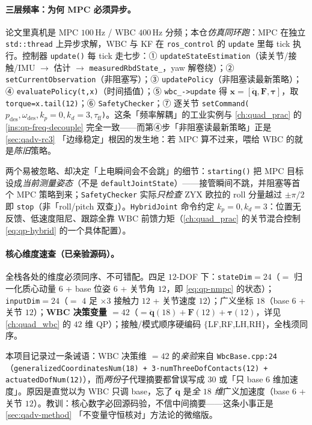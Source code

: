 \paragraph{三层频率：为何 MPC 必须异步。}
论文里真机是 MPC $100$\,Hz / WBC $400$\,Hz 分频；本仓\emph{仿真同环跑}：MPC 在独立 \texttt{std::thread} 上异步求解，WBC 与 KF 在 \texttt{ros\_control} 的 \texttt{update} 里每 tick 执行。控制器 \texttt{update()} 每 tick 走七步\cite{sleiman2021unified}：① \texttt{updateStateEstimation}（读关节/接触/IMU $\to$ 估计 $\to$ \texttt{measuredRbdState\_}，yaw 解卷绕）；② \texttt{setCurrentObservation}（非阻塞写）；③ \texttt{updatePolicy}（非阻塞读最新策略）；④ \texttt{evaluatePolicy(t,x)}（时间插值）；⑤ \texttt{wbc\_->update} 得 $\boldsymbol{x}=[\ddot{\boldsymbol{q}},\boldsymbol{F},\boldsymbol{\tau}]$，取 \texttt{torque=x.tail(12)}；⑥ \texttt{SafetyChecker}；⑦ 逐关节 \texttt{setCommand($p_{\mathrm{des}},\omega_{\mathrm{des}},k_p{=}0,k_d{=}3,\tau_{\mathrm{ff}}$)}。这条「频率解耦」的工业实例与 \cref{ch:quad_prac} 的 \cref{ins:qp-freq-decouple} 完全一致——而第④步「非阻塞读最新策略」正是 \cref{sec:qadv-rc3} 「边缘稳定」根因的发生地：若 MPC 算不过来，喂给 WBC 的就是\emph{陈旧}策略。

\begin{note}[控制器接管的两个安全细节]
两个易被忽略、却决定「上电瞬间会不会跳」的细节：\texttt{starting()} 把 MPC 目标设成\emph{当前测量姿态}（不是 \texttt{defaultJointState}）——接管瞬间不跳，并阻塞等首个 MPC 策略到来；\texttt{SafetyChecker} 实际\emph{只检查} ZYX 欧拉的 roll 分量越过 $\pm\pi/2$ 即 \texttt{stop}（非「roll/pitch 双查」）。\texttt{HybridJoint} 命令约定 $k_p{=}0,k_d{=}3$：位置无反馈、低速度阻尼、跟踪全靠 WBC 前馈力矩（\cref{ch:quad_prac} 的关节混合控制 \cref{eq:qp-hybrid} 的一个具体配置）。
\end{note}

\paragraph{核心维度速查（已亲验源码）。}
全栈各处的维度必须同序、不可错配。四足 $12$-DOF 下：\texttt{stateDim}$=24$（$=$ 归一化质心动量 $6$ + base 位姿 $6$ + 关节角 $12$，即 \cref{eq:qp-nmpc} 的状态）；\texttt{inputDim}$=24$（$=$ $4$ 足 $\times3$ 接触力 $12$ + 关节速度 $12$）；广义坐标 $18$（base $6$ + 关节 $12$）；\textbf{WBC 决策变量 $=42$}（$=\ddot{\boldsymbol{q}}(18)+\boldsymbol{F}(12)+\boldsymbol{\tau}(12)$，详见 \cref{ch:quad_wbc} 的 $42$ 维 QP）；接触/模式顺序硬编码 $\{$LF,RF,LH,RH$\}$，全栈须同序。

\begin{pitfall}
本项目记录过一条诫语：WBC 决策维 $=42$ 的\emph{亲验}来自 \texttt{WbcBase.cpp:24}（\texttt{generalizedCoordinatesNum(18) + 3·numThreeDofContacts(12) + actuatedDofNum(12)}），而\emph{两份}子代理摘要都曾误写成 $30$ 或「只 base $6$ 维加速度」。原因是直觉以为 WBC 只调 base，忘了 $\ddot{\boldsymbol{q}}$ 是\emph{全 $18$ 维}广义加速度（base $6$ + 关节 $12$）。教训：核心数字必回源码验，不信中间摘要——这条小事正是 \cref{sec:qadv-method} 「不变量守恒核对」方法论的微缩版。
\end{pitfall}

